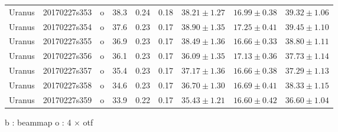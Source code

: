 \begin{table}
\begin{tabular}{|l|l|r|c|c|c|c|c|c|}
 Uranus   & 20170227s353 & o & 38.3 & 0.24 & 0.18 & $     38.21 \pm        1.27$  & $     16.99 \pm        0.38$ & $     39.32 \pm       1.06$  \\
 Uranus   & 20170227s354 & o & 37.6 & 0.23 & 0.17 & $     38.90 \pm        1.35$  & $     17.25 \pm        0.41$ & $     39.45 \pm       1.10$  \\
 Uranus   & 20170227s355 & o & 36.9 & 0.23 & 0.17 & $     38.49 \pm        1.36$  & $     16.66 \pm        0.33$ & $     38.80 \pm       1.11$  \\
 Uranus   & 20170227s356 & o & 36.1 & 0.23 & 0.17 & $     36.09 \pm        1.35$  & $     17.13 \pm        0.36$ & $     37.73 \pm       1.14$  \\
 Uranus   & 20170227s357 & o & 35.4 & 0.23 & 0.17 & $     37.17 \pm        1.36$  & $     16.66 \pm        0.38$ & $     37.29 \pm       1.13$  \\
 Uranus   & 20170227s358 & o & 34.6 & 0.23 & 0.17 & $     36.70 \pm        1.30$  & $     16.69 \pm        0.41$ & $     38.33 \pm       1.15$  \\
 Uranus   & 20170227s359 & o & 33.9 & 0.22 & 0.17 & $     35.43 \pm        1.21$  & $     16.60 \pm        0.42$ & $     36.60 \pm       1.04$  \\
\hline
\end{tabular}
b : beammap \filbreak
o : 4 $\times$ otf
\end{table}

